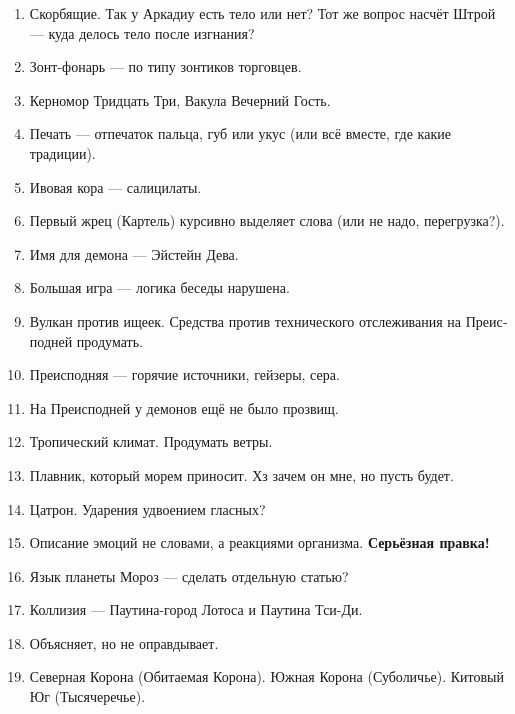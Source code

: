 \documentclass[a4paper,12pt,fleqn]{book}\usepackage{polyglossia}\setdefaultlanguage[babelshorthands=true]{russian}\setotherlanguage{english}\defaultfontfeatures{Ligatures=TeX,Mapping=tex-text}\usepackage{xcolor}\newcommand{\ml}[3]{#2}
\begin{document}
{\begin{enumerate}
\item Скорбящие.
Так у Аркадиу есть тело или нет?
Тот же вопрос насчёт Штрой --- куда делось тело после изгнания?

\item Зонт-фонарь --- по типу зонтиков торговцев.

\item Керномор Тридцать Три, Вакула Вечерний Гость.

\item Печать --- отпечаток пальца, губ или укус (или всё вместе, где какие традиции).

\item Ивовая кора --- салицилаты.

\item Первый жрец (Картель) курсивно выделяет слова (или не надо, перегрузка?).

\item Имя для демона --- Эйстейн Дева.

\item Большая игра --- логика беседы нарушена.

\item Вулкан против ищеек.
Средства против технического отслеживания на Преисподней продумать.

\item Преисподняя --- горячие источники, гейзеры, сера.

\item На Преисподней у демонов ещё не было прозвищ.

\item Тропический климат.
Продумать ветры.

\item Плавник, который морем приносит.
Хз зачем он мне, но пусть будет.

\item Цатрон.
Ударения удвоением гласных?

\item Описание эмоций не словами, а реакциями организма.
\textbf{Серьёзная правка!}

\item Язык планеты Мороз --- сделать отдельную статью?

\item Коллизия --- Паутина-город Лотоса и Паутина Тси-Ди.

\item Объясняет, но не оправдывает.

\item Северная Корона (Обитаемая Корона).
Южная Корона (Суболичье).
Китовый Юг (Тысячеречье).


\end{enumerate}}
\end{document}
